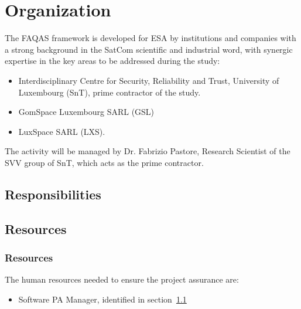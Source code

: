 \chapter{Organization}
\label{chapter:organization}


The FAQAS framework is developed for ESA by institutions and companies with a strong background in the SatCom
scientific and industrial word, with synergic expertise in the key areas to be addressed during
the study:
\begin{itemize}
  \item Interdisciplinary Centre for Security, Reliability and Trust, University of Luxembourg (SnT), prime contractor of the study.
  \item GomSpace Luxembourg SARL (GSL)
  \item LuxSpace SARL (LXS).
\end{itemize}

The activity will be managed by Dr. Fabrizio Pastore, Research Scientist of the SVV group of SnT, which acts as the prime contractor.

\section{Responsibilities}
\label{sec:resp}


\section{Resources}
\label{sec:resources}

\subsection{Resources}
The human resources needed to ensure the project assurance are:
\begin{itemize}
  \item Software PA Manager, identified in section~\ref{sec:resp}%
\end{itemize}

